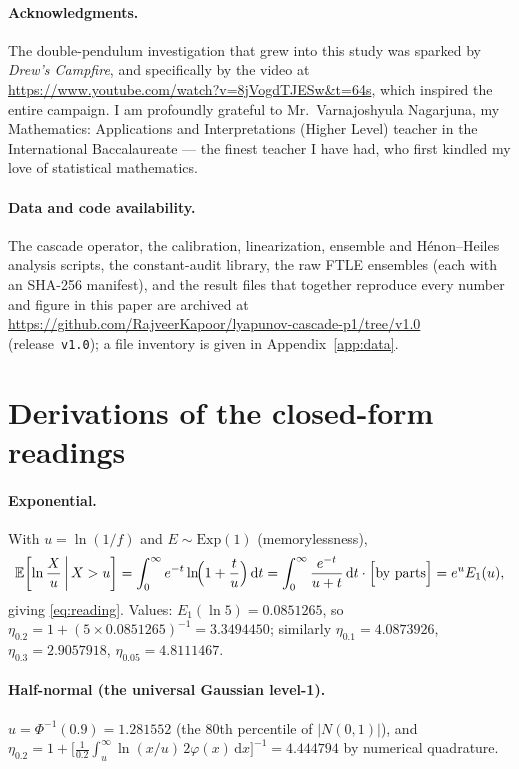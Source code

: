\documentclass[11pt,a4paper]{article}
\theoremstyle{remark}
\newcommand{\Exp}{\mathrm{Exp}}
\newcommand{\dd}{\,\mathrm{d}}
\begin{document}
\paragraph{Acknowledgments.} The double-pendulum investigation that grew into this study was
sparked by \emph{Drew's Campfire}, and specifically by the video at
\url{https://www.youtube.com/watch?v=8jVogdTJESw&t=64s}, which inspired the entire campaign. I am
profoundly grateful to Mr.~Varnajoshyula Nagarjuna, my Mathematics: Applications and
Interpretations (Higher Level) teacher in the International Baccalaureate --- the finest teacher I
have had, who first kindled my love of statistical mathematics.

\paragraph{Data and code availability.} The cascade operator, the calibration, linearization,
ensemble and H\'enon--Heiles analysis scripts, the constant-audit library, the raw FTLE ensembles
(each with an SHA-256 manifest), and the result files that together reproduce every number and figure
in this paper are archived at
\url{https://github.com/RajveerKapoor/lyapunov-cascade-p1/tree/v1.0} (release~\texttt{v1.0}); a file
inventory is given in Appendix~\ref{app:data}.

\appendix

\section{Derivations of the closed-form readings}\label{app:derivations}

\paragraph{Exponential.} With $u = \ln(1/f)$ and $E \sim \Exp(1)$ (memorylessness),
\[
\mathbb{E}\!\left[\ln\frac{X}{u} \,\middle|\, X > u\right]
= \int_0^\infty e^{-t}\ln\!\Bigl(1 + \frac{t}{u}\Bigr)\dd t
= \int_0^\infty \frac{e^{-t}}{u + t}\dd t
\cdot \Bigl[\text{by parts}\Bigr]
= e^{u}E_1(u),
\]
giving \eqref{eq:reading}. Values: $E_1(\ln 5) = 0.0851265$, so
$\eta_{0.2} = 1 + (5 \times 0.0851265)^{-1} = 3.3494450$; similarly
$\eta_{0.1} = 4.0873926$, $\eta_{0.3} = 2.9057918$, $\eta_{0.05} = 4.8111467$.

\paragraph{Half-normal (the universal Gaussian level-1).} $u = \Phi^{-1}(0.9) = 1.281552$ (the
$80$th percentile of $|N(0,1)|$), and
$\eta_{0.2} = 1 + \bigl[\tfrac{1}{0.2}\int_u^\infty \ln(x/u)\, 2\varphi(x)\dd x\bigr]^{-1}
= 4.444794$ by numerical quadrature.
\end{document}
